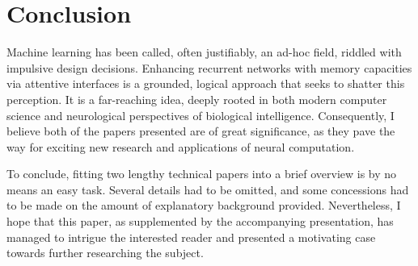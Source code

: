 \documentclass[]{article}
\begin{document}
\section{Conclusion}
\label{Conc}
Machine learning has been called, often justifiably, an ad-hoc field, riddled with impulsive design decisions. Enhancing recurrent networks with memory capacities via attentive interfaces is a grounded, logical approach that seeks to shatter this perception. It is a far-reaching idea, deeply rooted in both modern computer science and neurological perspectives of biological intelligence. Consequently, I believe both of the papers presented are of great significance, as they pave the way for exciting new research and applications of neural computation.

To conclude, fitting two lengthy technical papers into a brief overview is by no means an easy task. Several details had to be omitted, and some concessions had to be made on the amount of explanatory background provided. Nevertheless, I hope that this paper, as supplemented by the accompanying presentation, has managed to intrigue the interested reader and presented a motivating case towards further researching the subject. 



\end{document}
